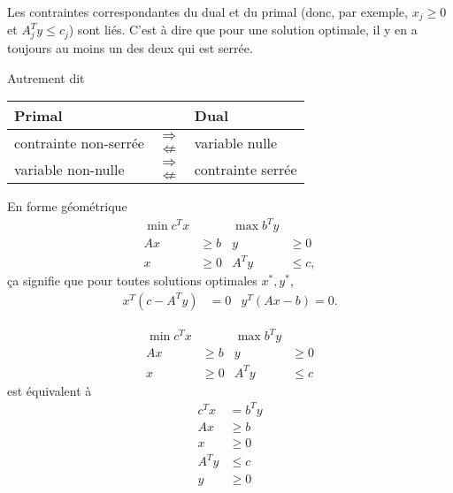\begin{myprop}
  Les contraintes correspondantes du dual et du primal
  (donc, par exemple, $x_j \geq 0$ et $A_j^T y \leq c_j$) sont liés.
  C'est à dire que pour une solution optimale, il y en a toujours
  au moins un des deux qui est serrée.

  Autrement dit
  \begin{center}
    \begin{tabular}{|lcl|}
      \hline
      Primal & & Dual\\
      \hline
      \multirow{2}{*}{contrainte non-serrée} & $\Rightarrow$ &
      \multirow{2}{*}{variable nulle}\\
      & $\not\Leftarrow$ & \\
      \multirow{2}{*}{variable non-nulle} & $\Rightarrow$ &
      \multirow{2}{*}{contrainte serrée}\\
      & $\not\Leftarrow$ & \\
      \hline
    \end{tabular}
  \end{center}

  En forme géométrique
  \begin{align*}
    \min c^Tx & & \max b^Ty\\
    Ax & \geq b & y & \geq 0\\
    x & \geq 0 & A^Ty & \leq c,
  \end{align*}
  ça signifie que pour toutes solutions optimales $x^*, y^*$,
  \begin{align*}
    x^T(c-A^Ty) & = 0 & y^T(Ax - b) = 0.
  \end{align*}
\end{myprop}

\begin{mycorr}
  \begin{align*}
    \min c^Tx & & \max b^Ty\\
    Ax & \geq b & y & \geq 0\\
    x & \geq 0 & A^Ty & \leq c
  \end{align*}
  est équivalent à
  \begin{align*}
    c^Tx & = b^Ty\\
    Ax & \geq b\\
    x & \geq 0\\
    A^Ty & \leq c\\
    y & \geq 0
  \end{align*}
\end{mycorr}

